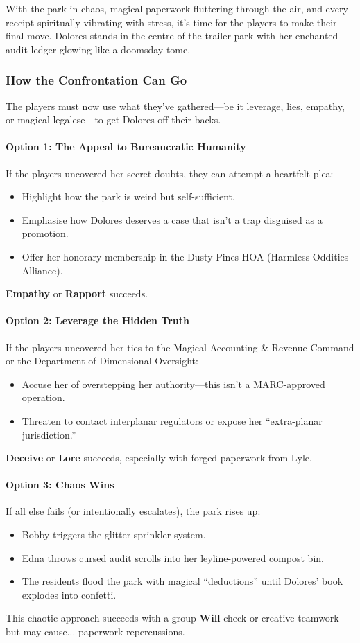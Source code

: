 \begin{multicols}{2}
With the park in chaos, magical paperwork fluttering through the air, and every receipt spiritually vibrating with stress, it’s time for the players to make their final move. Dolores stands in the centre of the trailer park with her enchanted audit ledger glowing like a doomsday tome.

\subsubsection*{How the Confrontation Can Go}
The players must now use what they’ve gathered—be it leverage, lies, empathy, or magical legalese—to get Dolores off their backs.

\paragraph{Option 1: The Appeal to Bureaucratic Humanity}
If the players uncovered her secret doubts, they can attempt a heartfelt plea:
\begin{itemize}
    \item Highlight how the park is weird but self-sufficient.
    \item Emphasise how Dolores deserves a case that isn’t a trap disguised as a promotion.
    \item Offer her honorary membership in the Dusty Pines HOA (Harmless Oddities Alliance).
\end{itemize}
\textbf{Empathy}  or \textbf{Rapport}  succeeds.

\paragraph{Option 2: Leverage the Hidden Truth}
If the players uncovered her ties to the Magical Accounting \& Revenue Command or the Department of Dimensional Oversight:
\begin{itemize}
    \item Accuse her of overstepping her authority—this isn’t a MARC-approved operation.
    \item Threaten to contact interplanar regulators or expose her “extra-planar jurisdiction.”
\end{itemize}
\textbf{Deceive} or \textbf{Lore}  succeeds, especially with forged paperwork from Lyle.

\paragraph{Option 3: Chaos Wins}
If all else fails (or intentionally escalates), the park rises up:
\begin{itemize}
    \item Bobby triggers the glitter sprinkler system.
    \item Edna throws cursed audit scrolls into her leyline-powered compost bin.
    \item The residents flood the park with magical “deductions” until Dolores’ book explodes into confetti.
\end{itemize}
This chaotic approach succeeds with a group \textbf{Will} check  or creative teamwork — but may cause... paperwork repercussions.


\end{multicols}
